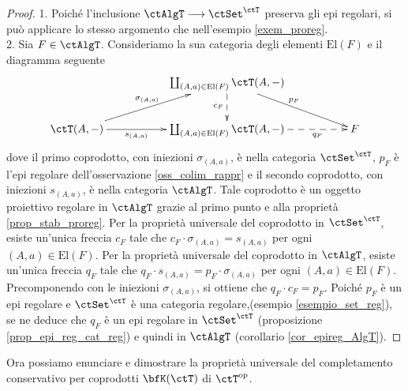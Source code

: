 \begin{proof}
 1. Poiché l'inclusione \(\ctAlgT \fun \ctSet^{\ctT}\) preserva gli epi regolari, si può applicare lo stesso argomento che
 nell'esempio \ref{exem_proreg}. \\
 2. Sia \(F \in \ctAlgT\). Consideriamo la sua categoria degli elementi \(\mathrm{El}(F)\) e il diagramma seguente
 \[\xymatrix{ & & \cop_{(A,a) \in \mathrm{El}(F)} \ctT(A,-) \ar@{-->}[d]_{c_F} \ar[rrd]^{p_F} \\
  \ctT(A,-) \ar[rru]^{\sigma_{(A,a)}} \ar[rr]_-{s_{(A,a)}} & & \cop_{(A,a) \in \mathrm{El}(F)} \ctT(A,-) \ar@{-->}[rr]_-{q_F} & & F}\]
 dove il primo coprodotto, con iniezioni \(\sigma_{(A,a)}\), è nella categoria \(\ctSet^{\ctT}\), \(p_F\) è l'epi regolare
 dell'osservazione \ref{oss_colim_rappr} e il secondo coprodotto, con iniezioni \(s_{(A,a)}\), è nella categoria \(\ctAlgT\).
 Tale coprodotto è un oggetto proiettivo regolare in \(\ctAlgT\) grazie al
 primo punto e alla proprietà \ref{prop_stab_proreg}. Per la proprietà universale del coprodotto in \(\ctSet^{\ctT}\),
 esiste un'unica freccia \(c_F\) tale che \(c_F \cdot \sigma_{(A,a)} = s_{(A,a)}\) per ogni \((A,a) \in \mathrm{El}(F)\). Per la
 proprietà universale del coprodotto in \(\ctAlgT\), esiste un'unica freccia \(q_F\) tale che
 \(q_F \cdot s_{(A,a)} = p_F \cdot \sigma_{(A,a)}\) per ogni \((A,a) \in \mathrm{El}(F)\). Precomponendo con le iniezioni
 \(\sigma_{(A,a)}\), si ottiene che \(q_F \cdot c_F = p_F\). Poiché \(p_F\) è un epi regolare e \(\ctSet^{\ctT}\) è una categoria
 regolare,(esempio \ref{esempio_set_reg}), se ne deduce che \(q_F\) è un epi regolare in \(\ctSet^{\ctT}\) (proposizione
 \ref{prop_epi_reg_cat_reg}) e quindi in \(\ctAlgT\) (corollario \ref{cor_epireg_AlgT}).
\end{proof}

Ora possiamo enunciare e dimostrare la proprietà universale del completamento conservativo per coprodotti
\({\bfK}(\ctT)\) di \(\ctT^{\op}\).

